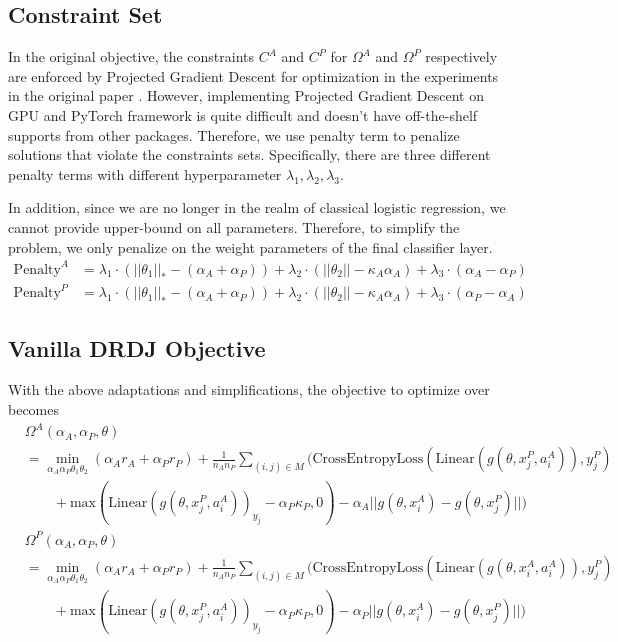 \documentclass{article}
\begin{document}
\subsection{Constraint Set}
In the original objective, the constraints $C^A$ and $C^P$ for $\Omega^A$ and $\Omega^P$ respectively 
are enforced by Projected Gradient Descent for optimization in the experiments in the 
original paper \citep{awasthi2022distributionally}. However, implementing Projected Gradient Descent
on GPU and PyTorch framework is quite difficult and doesn't have off-the-shelf supports from other 
packages. Therefore, we use penalty term to penalize solutions that violate the constraints sets. 
Specifically, there are three different penalty terms with different hyperparameter 
$\lambda_1, \lambda_2, \lambda_3$. 

In addition, since we are no longer in the realm of classical logistic regression, 
we cannot provide upper-bound on all parameters. Therefore, to simplify the problem, 
we only penalize on the weight parameters of the final classifier layer.
\begin{align*}
  \text{Penalty}^A &= \lambda_1 \cdot (||\theta_1||_* - (\alpha_A + \alpha_P)) + \lambda_2 \cdot 
  (||\theta_2|| - \kappa_A \alpha_A) + \lambda_3 \cdot (\alpha_A - \alpha_P)
  \\ \text{Penalty}^P &= \lambda_1 \cdot (||\theta_1||_* - (\alpha_A + \alpha_P)) + \lambda_2 \cdot 
  (||\theta_2|| - \kappa_A \alpha_A) + \lambda_3 \cdot (\alpha_P - \alpha_A)
\end{align*}


\subsection{Vanilla DRDJ Objective}
With the above adaptations and simplifications, the objective to optimize over becomes
\begin{align*}
  &\Omega^A(\alpha_A, \alpha_P, \theta) 
  \\ &= \min_{\alpha_{A}\alpha_{P}\theta_{1}\theta_{2}}(\alpha_{A}r_{A}+\alpha_{P}r_{P})+\frac{1}{n_{A}n_{P}}\sum_{(i,j) \in M}(\text{CrossEntropyLoss}(\text{Linear}(g(\theta, x_j^P, a_i^A)), y_j^P)
  \\ & \qquad +\mathrm{max}(\text{Linear}(g(\theta, x_j^P, a_i^A))_{y_j} -\alpha_{P}\kappa_{P},0)-\alpha_A||g(\theta, x_{i}^A) - g(\theta, x_{j}^P)||)
  \\ &\Omega^P(\alpha_A, \alpha_P, \theta) 
  \\ &= \min_{\alpha_{A}\alpha_{P}\theta_{1}\theta_{2}}(\alpha_{A}r_{A}+\alpha_{P}r_{P})+\frac{1}{n_{A}n_{P}}\sum_{(i,j) \in M}(\text{CrossEntropyLoss}(\text{Linear}(g(\theta, x_i^A, a_i^A)), y_j^P)
  \\ & \qquad +\mathrm{max}(\text{Linear}(g(\theta, x_j^P, a_i^A))_{y_j} -\alpha_{P}\kappa_{P},0)-\alpha_P||g(\theta, x_{i}^A) - g(\theta, x_{j}^P)||)
\end{align*}
\end{document}
